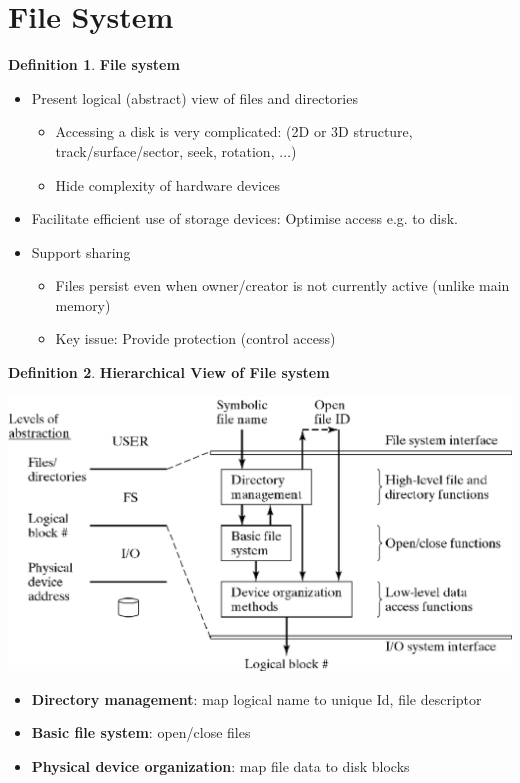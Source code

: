 \documentclass[11pt,a4paper]{article}
\theoremstyle{definition}
\newtheorem{definition}{Definition}[section]
\newenvironment{myitemize}
{ \begin{itemize}
    \setlength{\itemsep}{5pt}
    \setlength{\parskip}{0pt}
    \setlength{\parsep}{0pt}     }
{ \end{itemize}                  }
\begin{document}
\newpage

\section{File System}

\begin{definition}{\textbf{File system}}
	\begin{myitemize}
		\item Present logical (abstract) view of files and directories
		\begin{myitemize}
			\item Accessing a disk is very complicated: (2D or 3D structure, track/surface/sector, seek, rotation, $\dots$)
			\item Hide complexity of hardware devices
		\end{myitemize}
		\item Facilitate efficient use of storage devices: Optimise access e.g. to disk.
		\item Support sharing
		\begin{myitemize}
			\item Files persist even when owner/creator is not currently active (unlike main memory)
			\item Key issue: Provide protection (control access)
		\end{myitemize}
	\end{myitemize}
\end{definition}

\begin{definition}{\textbf{Hierarchical View of File system}}
	\begin{center}
		\includegraphics[scale=0.5]{m2/hierarchyFileSystem}
	\end{center}
	\begin{myitemize}
		\item \textbf{Directory management}: map logical name to unique Id, file descriptor
		\item \textbf{Basic file system}: open/close files
		\item \textbf{Physical device  organization}: map file data to disk blocks
	\end{myitemize}
\end{definition}
\end{document}

